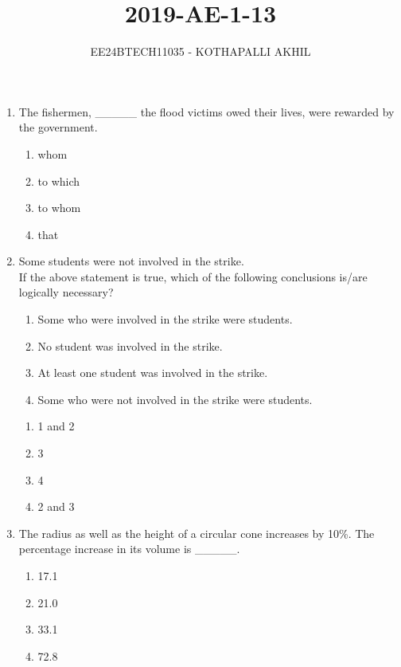 \documentclass[article]{IEEEtran}
\numberwithin{figure}{enumi}
\begin{document}


\title{2019-AE-1-13}
\author{EE24BTECH11035 - KOTHAPALLI AKHIL}
{\let\newpage\relax\maketitle}



\begin{enumerate}
    \item The fishermen, \_\_\_\_\_ the flood victims owed their lives, were rewarded by the government.
    \begin{enumerate}
        \item whom
        \item to which
        \item to whom
        \item that
    \end{enumerate}
    
    \item Some students were not involved in the strike. \\
    If the above statement is true, which of the following conclusions is/are logically necessary?
    \begin{enumerate}
        \item Some who were involved in the strike were students.
        \item No student was involved in the strike.
        \item At least one student was involved in the strike.
        \item Some who were not involved in the strike were students.
    \end{enumerate}
    \begin{enumerate}
        \item 1 and 2
        \item 3
        \item 4
        \item 2 and 3
    \end{enumerate}
    
    \item The radius as well as the height of a circular cone increases by 10\%. The percentage increase in its volume is \_\_\_\_\_.
    \begin{enumerate}
        \item 17.1
        \item 21.0
        \item 33.1
        \item 72.8
    \end{enumerate}
    

\end{enumerate}
\end{document}
